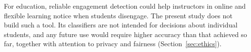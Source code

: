 For education, reliable engagement detection could help instructors in online and flexible learning notice when students disengage. The present study does not build such a tool. Its classifiers are not intended for decisions about individual students, and any future use would require higher accuracy than that achieved so far, together with attention to privacy and fairness (Section~\ref{sec:ethics}).
